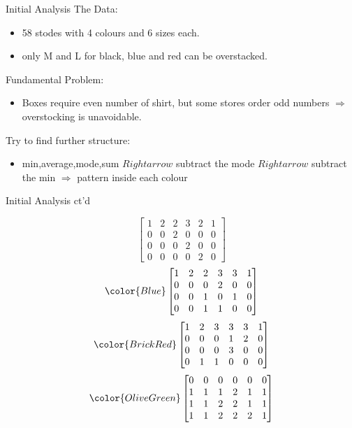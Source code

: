 \begin{frame}{Initial Analysis}
	The Data:
	\begin{itemize}
		\item 58 stodes with 4 colours and 6 sizes each.
		\item only M and L for black, blue and red can be overstacked.
	\end{itemize}
	Fundamental Problem:
	\begin{itemize}
		\item Boxes require even number of shirt, but some stores order odd numbers $\Rightarrow$ overstocking is unavoidable.
	\end{itemize}
	Try to find further structure:
	\begin{itemize}
		\item min,average,mode,sum $Rightarrow$ subtract the mode $Rightarrow$ subtract the min $\Rightarrow$ pattern inside each colour
	\end{itemize}
\end{frame}
\begin{frame}{Initial Analysis ct'd}

\begin{equation}
     \begin{bmatrix}
     1&2&2&3&2&1\\
  0&0&2&0&0&0\\
  0&0&0&2&0&0\\
  0&0&0&0&2&0
     \end{bmatrix}
\end{equation}
\begin{equation}
\color{Blue}
    \begin{bmatrix}
        1&2&2&3&3&1\\
        0&0&0&2&0&0\\
        0&0&1&0&1&0\\
        0&0&1&1&0&0\\
    \end{bmatrix}
\end{equation}
\begin{equation}
\color{BrickRed}
    \begin{bmatrix}
         1&2&3&3&3&1\\
         0&0&0&1&2&0\\
         0&0&0&3&0&0\\
         0&1&1&0&0&0\\
    \end{bmatrix}
\end{equation}
\begin{equation}
\color{OliveGreen}
    \begin{bmatrix}
         0&0&0&0&0&0\\
         1&1&1&2&1&1\\
         1&1&2&2&1&1\\
         1&1&2&2&2&1\\

    \end{bmatrix}
\end{equation}
\end{frame}

